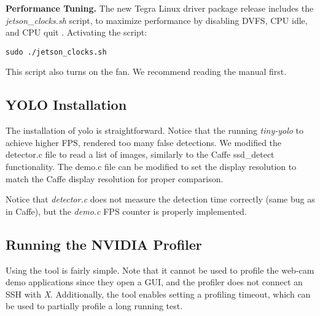\textbf{Performance Tuning.}
The new Tegra Linux driver package release includes the \textit{jetson\_clocks.sh} script, to maximize performance by disabling DVFS, CPU idle, and CPU quit \cite{tegradriverpack242}. Activating the script:
\begin{lstlisting} 
sudo ./jetson_clocks.sh
\end{lstlisting}
This script also turns on the fan. We recommend reading the manual first.

\subsection{YOLO Installation}
The installation of yolo is straightforward. Notice that the running \textit{tiny-yolo} to achieve higher FPS, rendered too many false detections.
We modified the detector.c file to read a list of images, similarly to the Caffe ssd\_detect functionality. The demo.c file can be modified to set the display resolution to match the Caffe display resolution for proper comparison.

Notice that \textit{detector.c} does not measure the detection time correctly (same bug as in Caffe), but the \textit{demo.c} FPS counter is properly implemented.

\subsection{Running the NVIDIA Profiler}
Using the tool is fairly simple. Note that it cannot be used to profile the web-cam demo applications since they open a GUI, and the profiler does not connect an SSH with \textit{X}. Additionally, the tool enables setting a profiling timeout, which can be used to partially profile a long running test. 
